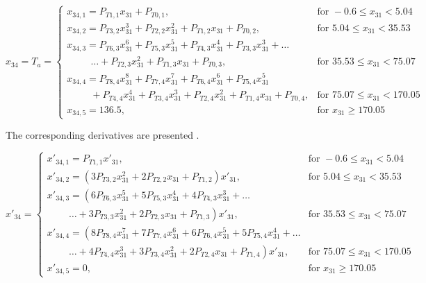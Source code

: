 \begin{equation}\label{eq:tempCondAux}
x_{34}=T_{a}=\begin{cases}
x_{34,1}=P_{T 1,1}x_{31}+P_{T 0,1}, & \text{for } -0.6 \leq x_{31} < 5.04  \\
x_{34,2}=P_{T 3,2}x_{31}^{3}+P_{T 2,2}x_{31}^{2}+P_{T 1,2}x_{31}+P_{T 0,2}, &  \text{for } 5.04 \leq x_{31} < 35.53   \\
x_{34,3}=P_{T 6,3}x_{31}^{6}+P_{T 5,3}x_{31}^{5}+P_{T 4,3}x_{31}^{4}+P_{T 3,3}x_{31}^{3}+ \dots \\
\qquad\ \ \dotsc +P_{T 2,3}x_{31}^{2}+P_{T 1,3}x_{31}+P_{T 0,3}, &  \text{for } 35.53 \leq x_{31} < 75.07   \\
x_{34,4}=P_{T 8,4}x_{31}^{8}+P_{T 7,4}x_{31}^{7}+P_{T 6,4}x_{31}^{6}+P_{T 5,4}x_{31}^{5} \\
\qquad\ \ +P_{T 4,4}x_{31}^{4}+P_{T 3,4}x_{31}^{3}+P_{T 2,4}x_{31}^{2}+P_{T 1,4}x_{31}+P_{T 0,4}, &  \text{for } 75.07 \leq x_{31} < 170.05   \\
x_{34,5}=136.5, &  \text{for }  x_{31} \geq 170.05   
\end{cases}
\end{equation}

The corresponding derivatives are presented .

\begin{equation}\label{eq:TCondDerAux}
x'_{34}=\begin{cases}
x'_{34,1}=P_{T 1,1}x'_{31}, & \text{for } -0.6 \leq x_{31} < 5.04  \\
x'_{34,2}=\left(3P_{T 3,2}x_{31}^{2}+2P_{T 2,2}x_{31}+P_{T 1,2}\right)x'_{31}, &  \text{for } 5.04\leq x_{31} < 35.53   \\
x'_{34,3}=\left(6 P_{T 6,3}x_{31}^{5}+5P_{T 5,3}x_{31}^{4}+4P_{T 4,3}x_{31}^{3}+ \dots
\right. \\
\qquad\  \left. \dotsc +3P_{T 3,3}x_{31}^{2}+2P_{T 2,3}x_{31}+P_{T 1,3}\right)x'_{31}, &  \text{for } 35.53\leq x_{31} < 75.07   \\
x'_{34,4}=\left(8 P_{T 8,4}x_{31}^{7}+7P_{T 7,4}x_{31}^{6}+6P_{T 6,4}x_{31}^{5}
+5P_{T 5,4}x_{31}^{4}+ \dots \right. \\
\qquad\  \left. \dotsc +4P_{T 4,4}x_{31}^{3}+3P_{T 3,4}x_{31}^{2}+2P_{T 2,4}x_{31}+P_{T 1,4}\right)x'_{31}, &  \text{for } 75.07\leq x_{31} < 170.05   \\
x'_{34,5}=0, &  \text{for }  x_{31} \geq 170.05   
\end{cases}
\end{equation}


